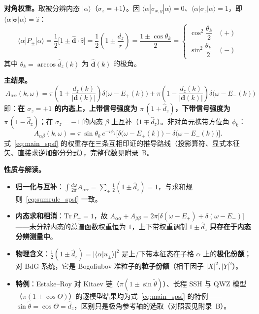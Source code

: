 \documentclass[onecolumn,aps,prl,superscriptaddress,longbibliography]{revtex4-2}
\begin{document}
\textbf{对角权重。}取被分辨内态 $|\alpha\rangle$（$\sigma_z = +1$）。因 $\langle\alpha|\sigma_{x,y}|\alpha\rangle = 0$、$\langle\alpha|\sigma_z|\alpha\rangle = 1$，即 $\langle\alpha|\symbf{\sigma}|\alpha\rangle = \hat{z}$：
\begin{equation}\label{eq:weight_spsf}
\langle\alpha|P_\pm|\alpha\rangle = \frac{1}{2}\Big[1 \pm \hat{\mathbf{d}}\cdot\hat{z}\Big] = \frac{1}{2}\left(1 \pm \frac{d_z}{r}\right) = \frac{1 \pm \cos\theta_k}{2} = \begin{cases}\cos^2\dfrac{\theta_k}{2} & (+)\\[6pt] \sin^2\dfrac{\theta_k}{2} & (-)\end{cases}
\end{equation}
其中 $\theta_k = \arccos\hat d_z(k)$ 为 $\hat{\mathbf{d}}(k)$ 的极角。

\textbf{主结果。}
\begin{equation}\label{eq:main_spsf}
\boxed{\ A_{\alpha\alpha}(k,\omega) = \pi\left(1 + \frac{d_z(k)}{|\mathbf{d}(k)|}\right)\delta\big(\omega - E_+(k)\big) + \pi\left(1 - \frac{d_z(k)}{|\mathbf{d}(k)|}\right)\delta\big(\omega - E_-(k)\big)\ }
\end{equation}
即：\textbf{在 $\sigma_z = +1$ 的内态上，上带信号强度为 $\pi\,(1 + \hat d_z)$，下带信号强度为 $\pi\,(1 - \hat d_z)$}；在 $\sigma_z = -1$ 的内态 $\beta$ 上互补（$1 \mp \hat d_z$）。非对角元携带方位角 $\phi_k$：
\begin{equation}\label{eq:nondiag}
A_{\alpha\beta}(k,\omega) = \pi\,\sin\theta_k\,e^{-i\phi_k}\Big[\delta\big(\omega - E_+(k)\big) - \delta\big(\omega - E_-(k)\big)\Big].
\end{equation}
式~\eqref{eq:main_spsf} 的权重存在三条互相印证的推导路线（投影算符、显式本征矢、直接求逆加部分分式），完整代数见附录~B。

\textbf{性质与解读。}
\begin{itemize}
\item \textbf{归一化与互补}：$\int\frac{d\omega}{2\pi}A_{\alpha\alpha} = \sum_\pm\frac{1}{2}(1\pm\hat d_z) = 1$，与求和规则~\eqref{eq:sumrule_spsf} 一致。
\item \textbf{内态求和相消}：$\mathrm{Tr}\,P_\pm = 1$，故 $A_{\alpha\alpha} + A_{\beta\beta} = 2\pi\big[\delta(\omega-E_+) + \delta(\omega-E_-)\big]$——未分辨内态的总谱函数权重恒为 $1$，上下带权重调制 $1\pm\hat d_z$ \textbf{只存在于内态分辨测量中}。
\item \textbf{物理含义}：$\frac{1}{2}(1\pm\hat d_z) = |\langle\alpha|u_\pm\rangle|^2$ 是上/下带本征态在子格 $\alpha$ 上的\textbf{极化份额}；对 BdG 系统，它是 Bogoliubov 准粒子的\textbf{粒子份额}（相干因子 $|X|^2,|Y|^2$）。
\item \textbf{特例}：Estake--Roy 对 Kitaev 链（$\pi(1\pm\sin\tilde\theta)$）、长程 SSH 与 QWZ 模型（$\pi(1\pm\cos\Theta)$）的逐模型结果均为式~\eqref{eq:main_spsf} 的特例——$\sin\tilde\theta = \cos\Theta = \hat d_z$，区别只是极角参考轴的选取（对照表见附录~B）\cite{estakeRoy2025}。
\end{itemize}
\end{document}
